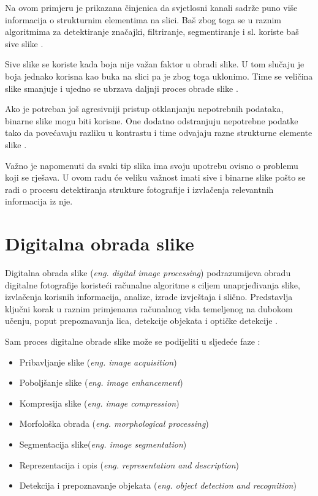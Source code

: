 \documentclass{foi}
\begin{document}
Na ovom primjeru je prikazana činjenica da svjetlosni kanali sadrže puno više informacija o strukturnim elementima na slici. Baš zbog toga se u raznim algoritmima za detektiranje značajki, filtriranje, segmentiranje i sl. koriste baš sive slike \cite{LumVsChrom}. 

Sive slike se koriste kada boja nije važan faktor u obradi slike. U tom slučaju je boja jednako korisna kao buka na slici pa je zbog toga uklonimo. Time se veličina slike smanjuje i ujedno se ubrzava daljnji proces obrade slike \cite{LumVsChrom}.

Ako je potreban još agresivniji pristup otklanjanju nepotrebnih podataka, binarne slike mogu biti korisne. One dodatno odstranjuju nepotrebne podatke tako da povećavaju razliku u kontrastu i time odvajaju razne strukturne elemente slike \cite{LumVsChrom}.

Važno je napomenuti da svaki tip slika ima svoju upotrebu ovisno o problemu koji se rješava. U ovom radu će veliku važnost imati sive i binarne slike pošto se radi o procesu detektiranja strukture fotografije i izvlačenja relevantnih informacija iz nje.

\section{Digitalna obrada slike}

Digitalna obrada slike (\textit{eng. digital image processing}) podrazumijeva obradu digitalne fotografije koristeći računalne algoritme s ciljem unaprjeđivanja slike, izvlačenja korisnih informacija, analize, izrade izvještaja i slično. Predstavlja ključni korak u raznim primjenama računalnog vida temeljenog na dubokom učenju, poput prepoznavanja lica, detekcije objekata i optičke detekcije \cite{ImageProcessing}. 

\begin{flushleft}
Sam proces digitalne obrade slike može se podijeliti u sljedeće faze \cite{ImageProcessing}:
\begin{itemize}
\item Pribavljanje slike (\textit{eng. image acquisition})
\item Poboljšanje slike (\textit{eng. image enhancement})
\item Kompresija slike (\textit{eng. image compression})
\item Morfološka obrada (\textit{eng. morphological processing})
\item Segmentacija slike(\textit{eng. image segmentation})
\item Reprezentacija i opis (\textit{eng. representation and description})
\item Detekcija i prepoznavanje objekata (\textit{eng. object detection and recognition})
\end{itemize}
\end{flushleft}
\end{document}
